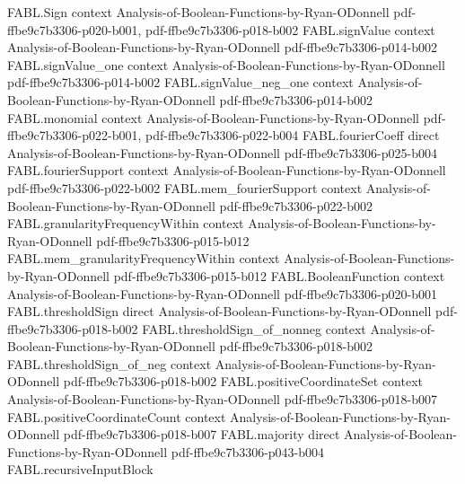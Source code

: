 \begin{theorem}
\label{FABL.discreteDerivative_add}
\leanok
{}
\proofstep
  {FABL.Sign}
  {context}
  {Analysis-of-Boolean-Functions-by-Ryan-ODonnell}
  {pdf-ffbe9c7b3306-p020-b001,
    pdf-ffbe9c7b3306-p018-b002}
\proofstep
  {FABL.signValue}
  {context}
  {Analysis-of-Boolean-Functions-by-Ryan-ODonnell}
  {pdf-ffbe9c7b3306-p014-b002}
\proofstep
  {FABL.signValue_one}
  {context}
  {Analysis-of-Boolean-Functions-by-Ryan-ODonnell}
  {pdf-ffbe9c7b3306-p014-b002}
\proofstep
  {FABL.signValue_neg_one}
  {context}
  {Analysis-of-Boolean-Functions-by-Ryan-ODonnell}
  {pdf-ffbe9c7b3306-p014-b002}
\proofstep
  {FABL.monomial}
  {context}
  {Analysis-of-Boolean-Functions-by-Ryan-ODonnell}
  {pdf-ffbe9c7b3306-p022-b001,
    pdf-ffbe9c7b3306-p022-b004}
\proofstep
  {FABL.fourierCoeff}
  {direct}
  {Analysis-of-Boolean-Functions-by-Ryan-ODonnell}
  {pdf-ffbe9c7b3306-p025-b004}
\proofstep
  {FABL.fourierSupport}
  {context}
  {Analysis-of-Boolean-Functions-by-Ryan-ODonnell}
  {pdf-ffbe9c7b3306-p022-b002}
\proofstep
  {FABL.mem_fourierSupport}
  {context}
  {Analysis-of-Boolean-Functions-by-Ryan-ODonnell}
  {pdf-ffbe9c7b3306-p022-b002}
\proofstep
  {FABL.granularityFrequencyWithin}
  {context}
  {Analysis-of-Boolean-Functions-by-Ryan-ODonnell}
  {pdf-ffbe9c7b3306-p015-b012}
\proofstep
  {FABL.mem_granularityFrequencyWithin}
  {context}
  {Analysis-of-Boolean-Functions-by-Ryan-ODonnell}
  {pdf-ffbe9c7b3306-p015-b012}
\proofstep
  {FABL.BooleanFunction}
  {context}
  {Analysis-of-Boolean-Functions-by-Ryan-ODonnell}
  {pdf-ffbe9c7b3306-p020-b001}
\proofstep
  {FABL.thresholdSign}
  {direct}
  {Analysis-of-Boolean-Functions-by-Ryan-ODonnell}
  {pdf-ffbe9c7b3306-p018-b002}
\proofstep
  {FABL.thresholdSign_of_nonneg}
  {context}
  {Analysis-of-Boolean-Functions-by-Ryan-ODonnell}
  {pdf-ffbe9c7b3306-p018-b002}
\proofstep
  {FABL.thresholdSign_of_neg}
  {context}
  {Analysis-of-Boolean-Functions-by-Ryan-ODonnell}
  {pdf-ffbe9c7b3306-p018-b002}
\proofstep
  {FABL.positiveCoordinateSet}
  {context}
  {Analysis-of-Boolean-Functions-by-Ryan-ODonnell}
  {pdf-ffbe9c7b3306-p018-b007}
\proofstep
  {FABL.positiveCoordinateCount}
  {context}
  {Analysis-of-Boolean-Functions-by-Ryan-ODonnell}
  {pdf-ffbe9c7b3306-p018-b007}
\proofstep
  {FABL.majority}
  {direct}
  {Analysis-of-Boolean-Functions-by-Ryan-ODonnell}
  {pdf-ffbe9c7b3306-p043-b004}
\proofstep
  {FABL.recursiveInputBlock}

\end{theorem}
